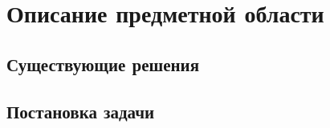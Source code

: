 \section{Описание предметной области}


\subsection{Существующие решения}


\subsection{Постановка задачи}


